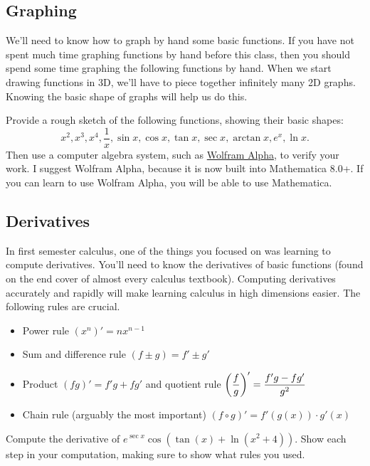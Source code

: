 \subsection{Graphing}
We'll need to know how to graph by hand some basic functions. If you have not spent much time graphing functions by hand before this class, then you should spend some time graphing the following functions by hand. When we start drawing functions in 3D, we'll have to piece together infinitely many 2D graphs.  Knowing the basic shape of graphs will help us do this.
\begin{problem}
Provide a rough sketch of the following functions, showing their basic shapes:
$$\displaystyle x^2, x^3, x^4, \frac{1}{x}, \sin x, \cos x, \tan x, \sec x, \arctan x, e^x,\ln x.$$ 
Then use a computer algebra system, such as \href{http://http://www.wolframalpha.com/}{Wolfram Alpha}, to verify your work. I suggest Wolfram Alpha, because it is now built into Mathematica 8.0+.  If you can learn to use Wolfram Alpha, you will be able to use Mathematica. 
\end{problem}


\subsection{Derivatives}
In first semester calculus, one of the things you focused on was learning to compute derivatives. You'll need to know the derivatives of basic functions (found on the end cover of almost every calculus textbook). Computing derivatives accurately and rapidly will make learning calculus in high dimensions easier.
The following rules are crucial.
\begin{itemize}
\item Power rule {$(x^n)' = nx^{n-1}$}
\item Sum and difference rule {$(f\pm g) = f'\pm g'$}
\item Product {$(fg)' = f' g + fg'$} and quotient rule  {$\displaystyle\left(\frac f g\right)' = \frac{f' g - fg'}{g^2}$}
\item Chain rule (arguably the most important) {$(f\circ g)' = f'(g(x))\cdot g'(x)$}
\end{itemize}

\begin{problem}
Compute the derivative of $e^{\sec x}\cos(\tan(x)+\ln(x^2+4))$. Show each step in your computation, making sure to show what rules you used. 
\end{problem}

